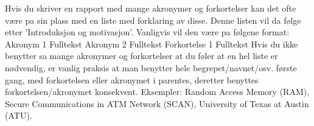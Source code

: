 Hvis du skriver en rapport med mange akronymer og forkortelser kan det ofte være pa sin plass med en liste med forklaring av disse. Denne listen vil da følge etter ’Introduksjon og motivasjon’. Vanligvis vil den være pa følgene format:
Akronym 1 Fulltekst Akronym 2 Fulltekst Forkortelse 1 Fulltekst
Hvis du ikke benytter sa mange akronymer og forkortelser at du føler at en hel liste er nødvendig, er vanlig praksis at man benytter hele begrepet/navnet/osv. første gang, med forkortelsen eller akronymet i parentes, deretter benyttes forkortelsen/akronymet konsekvent. Eksempler: Random Access Memory (RAM), Secure Communications in ATM Network (SCAN), University of Texas at Austin (ATU).